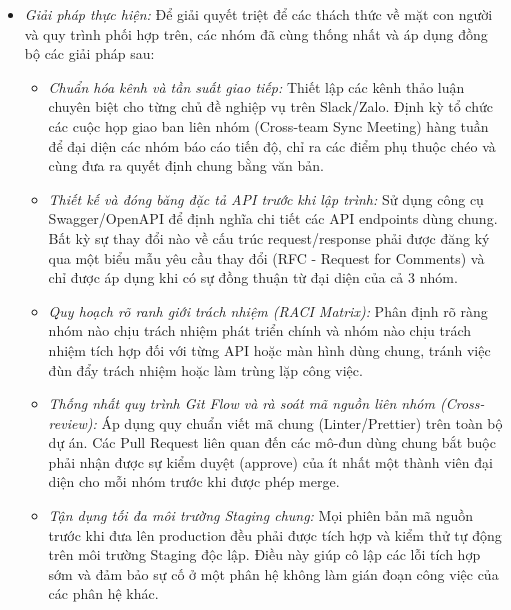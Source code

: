 \begin{itemize}
    \item \textit{Giải pháp thực hiện:} Để giải quyết triệt để các thách thức về mặt con người và quy trình phối hợp trên, các nhóm đã cùng thống nhất và áp dụng đồng bộ các giải pháp sau:
    \begin{itemize}
        \item \textit{Chuẩn hóa kênh và tần suất giao tiếp:} Thiết lập các kênh thảo luận chuyên biệt cho từng chủ đề nghiệp vụ trên Slack/Zalo. Định kỳ tổ chức các cuộc họp giao ban liên nhóm (Cross-team Sync Meeting) hàng tuần để đại diện các nhóm báo cáo tiến độ, chỉ ra các điểm phụ thuộc chéo và cùng đưa ra quyết định chung bằng văn bản.
        \item \textit{Thiết kế và đóng băng đặc tả API trước khi lập trình:} Sử dụng công cụ Swagger/OpenAPI để định nghĩa chi tiết các API endpoints dùng chung. Bất kỳ sự thay đổi nào về cấu trúc request/response phải được đăng ký qua một biểu mẫu yêu cầu thay đổi (RFC - Request for Comments) và chỉ được áp dụng khi có sự đồng thuận từ đại diện của cả 3 nhóm.
        \item \textit{Quy hoạch rõ ranh giới trách nhiệm (RACI Matrix):} Phân định rõ ràng nhóm nào chịu trách nhiệm phát triển chính và nhóm nào chịu trách nhiệm tích hợp đối với từng API hoặc màn hình dùng chung, tránh việc đùn đẩy trách nhiệm hoặc làm trùng lặp công việc.
        \item \textit{Thống nhất quy trình Git Flow và rà soát mã nguồn liên nhóm (Cross-review):} Áp dụng quy chuẩn viết mã chung (Linter/Prettier) trên toàn bộ dự án. Các Pull Request liên quan đến các mô-đun dùng chung bắt buộc phải nhận được sự kiểm duyệt (approve) của ít nhất một thành viên đại diện cho mỗi nhóm trước khi được phép merge.
        \item \textit{Tận dụng tối đa môi trường Staging chung:} Mọi phiên bản mã nguồn trước khi đưa lên production đều phải được tích hợp và kiểm thử tự động trên môi trường Staging độc lập. Điều này giúp cô lập các lỗi tích hợp sớm và đảm bảo sự cố ở một phân hệ không làm gián đoạn công việc của các phân hệ khác.
    \end{itemize}
\end{itemize}
